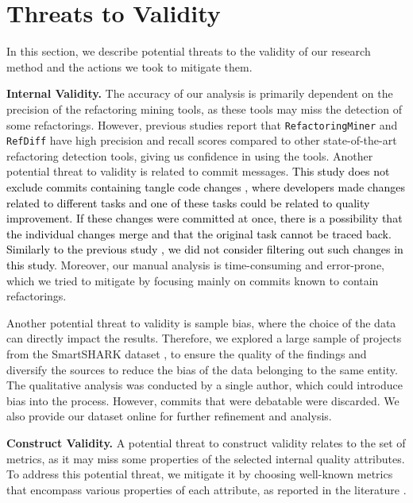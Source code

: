 \section{Threats to Validity}
\label{Section:Threats}

In this section, we describe potential threats to the validity of our research method and the actions we took to mitigate them.

\textbf{Internal Validity.} The accuracy of our analysis is primarily dependent on the precision of the refactoring mining tools, as these tools may miss the detection of some refactorings. However, previous studies \citep{silva2016we,tsantalis2018accurate,silva2017refdiff} report that \texttt{RefactoringMiner} and \texttt{RefDiff} have high precision and recall scores compared to other state-of-the-art refactoring detection tools, giving us confidence in using the tools. Another potential threat to validity is related to commit messages. \textcolor{black}{This study does not exclude commits containing tangle code changes \citep{herzig2016impact,kirinuki2014hey}, where developers made changes related to different tasks and one of these tasks could be related to quality improvement. If these changes were committed at once, there is a possibility that the individual changes merge and that the original task cannot be traced back. Similarly to the previous study \cite{pantiuchina2018improving}, we did not consider filtering out such changes in this study}. Moreover, our manual analysis is time-consuming and error-prone, which we tried to mitigate by focusing mainly on commits known to contain refactorings. 

Another potential threat to validity is sample bias, where the choice of the data can directly impact the results. Therefore, we explored a large sample of projects from the SmartSHARK dataset \citep{trautsch2021msr}, to ensure the quality of the findings and diversify the sources to reduce the bias of the data belonging to the same entity. The qualitative analysis was conducted by a single author, which could introduce bias into the process. However, commits that were debatable were discarded. We also provide our dataset online for further refinement and analysis. %

\textbf{Construct Validity.} A potential threat to construct validity relates to the set of metrics, as it may miss some properties of the selected internal quality attributes. To address this potential threat, we mitigate it by choosing well-known metrics that encompass various properties of each attribute, as reported in the literature \citep{chidamber1994metrics}.

